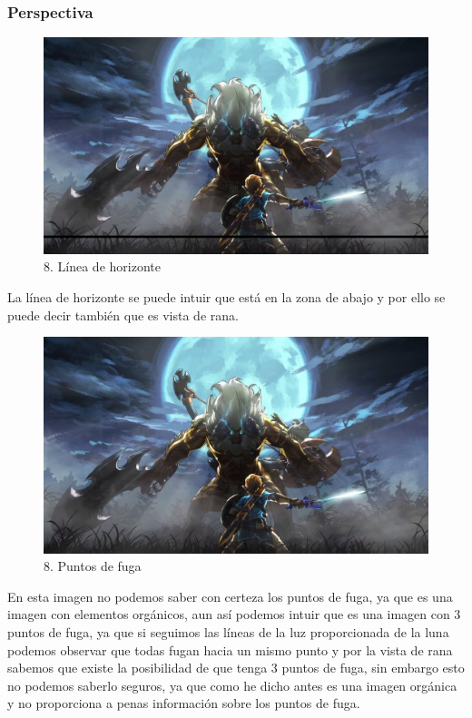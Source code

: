 \documentclass[12pt]{article}
\begin{document}
        \subsubsection{Perspectiva}

\begin{figure}[H]
      \centering
      \includegraphics[scale=0.25]{images/Raúl/Sección 8/Imagen 8 horizonte.jpg}
      \caption{\small 8. Línea de horizonte}
    \end{figure}

La línea de horizonte se puede intuir que está en la zona de abajo y por ello se puede decir también que es vista de rana.

\begin{figure}[H]
      \centering
      \includegraphics[scale=0.25]{images/Concepts/8_concept_art}
      \caption{\small 8. Puntos de fuga}
    \end{figure}
    
En esta imagen no podemos saber con certeza los puntos de fuga, ya que es una imagen con elementos orgánicos, aun así podemos intuir que es una imagen con 3 puntos de fuga, ya que si seguimos las líneas de la luz proporcionada de la luna podemos observar que todas fugan hacia un mismo punto y por la vista de rana sabemos que existe la posibilidad de que tenga 3 puntos de fuga, sin embargo esto no podemos saberlo seguros, ya que como he dicho antes es una imagen orgánica y no proporciona a penas información sobre los puntos de fuga.
\end{document}
